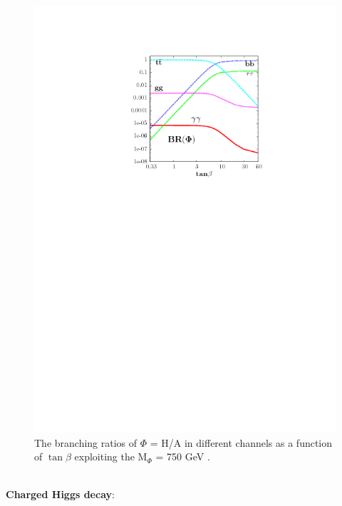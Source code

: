 \begin{figure}[htp]
\centering
\hspace{-0.3cm} \includegraphics[trim={6cm 17.50cm 4.0cm 3.50cm},clip, scale=0.8]{fig/chapt2/BR-Atb.png}
\caption{The branching ratios of $\Phi$ = H/A in different channels as a function of $\tan\beta$ exploiting the M$_{\Phi}$ = 750 GeV \cite{Djouadi:2016eyy}. }\label{fig:Heavy_H750_BR}
\end{figure}
\\
\noindent \textbf{Charged Higgs decay}:

